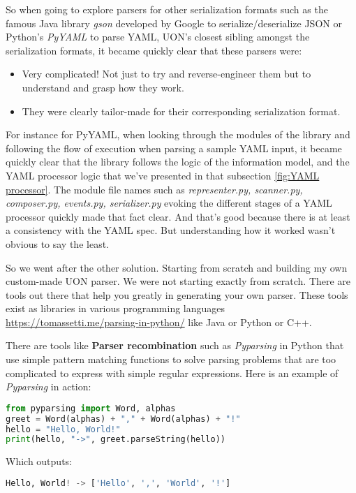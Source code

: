 \documentclass[12pt]{article}
\begin{document}
So when going to explore parsers for other serialization formats such as the famous Java library \emph{gson} developed by Google to serialize/deserialize JSON or Python’s \emph{PyYAML} to parse YAML, UON’s closest sibling amongst the serialization formats, it became quickly clear that these parsers were:
\begin{itemize}
    \item Very complicated! Not just to try and reverse-engineer them but to understand and grasp how they work.
    \item They were clearly tailor-made for their corresponding serialization format.
\end{itemize}

For instance for PyYAML, when looking through the modules of the library and following the flow of execution when parsing a sample YAML input, it became quickly clear that the library follows the logic of the information model, and the YAML processor logic that we’ve presented in that subsection \ref{fig:YAML processor}. The module file names such as \emph{representer.py, scanner.py, composer.py, events.py, serializer.py} evoking the different stages of a YAML processor quickly made that fact clear. And that’s good because there is at least a consistency with the YAML spec. But understanding how it worked wasn’t obvious to say the least.

So we went after the other solution. Starting from scratch and building my own custom-made UON parser. We were not starting exactly from scratch. There are tools out there that help you greatly in generating your own parser. These tools exist as libraries in various programming languages \url{https://tomassetti.me/parsing-in-python/} like Java or Python or C++.

There are tools like \textbf{Parser recombination} such as \emph{Pyparsing} in Python that use simple pattern matching functions to solve parsing problems that are too complicated to express with simple regular expressions. Here is an example of \emph{Pyparsing} in action: 
\begin{lstlisting}[language=Python]
from pyparsing import Word, alphas
greet = Word(alphas) + "," + Word(alphas) + "!"
hello = "Hello, World!"
print(hello, "->", greet.parseString(hello))
\end{lstlisting}
Which outputs:
\begin{lstlisting}[language=Python]
Hello, World! -> ['Hello', ',', 'World', '!']
\end{lstlisting}
\end{document}
